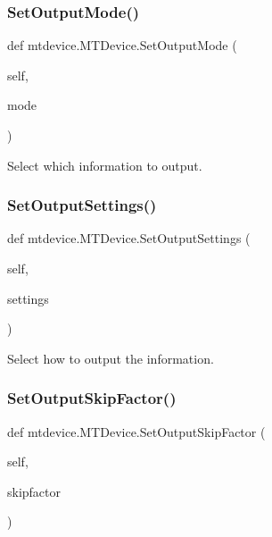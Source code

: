 \subsubsection{\texorpdfstring{Set\+Output\+Mode()}{SetOutputMode()}}
{\footnotesize\ttfamily def mtdevice.\+M\+T\+Device.\+Set\+Output\+Mode (\begin{DoxyParamCaption}\item[{}]{self,  }\item[{}]{mode }\end{DoxyParamCaption})}

\begin{DoxyVerb}Select which information to output.\end{DoxyVerb}
 \mbox{\label{classmtdevice_1_1MTDevice_ac8f77a2d1d393aea71a7790929791cc0}} 
\subsubsection{\texorpdfstring{Set\+Output\+Settings()}{SetOutputSettings()}}
{\footnotesize\ttfamily def mtdevice.\+M\+T\+Device.\+Set\+Output\+Settings (\begin{DoxyParamCaption}\item[{}]{self,  }\item[{}]{settings }\end{DoxyParamCaption})}

\begin{DoxyVerb}Select how to output the information.\end{DoxyVerb}
 \mbox{\label{classmtdevice_1_1MTDevice_a00ae63328881e07081d07a385ecfe858}} 
\subsubsection{\texorpdfstring{Set\+Output\+Skip\+Factor()}{SetOutputSkipFactor()}}
{\footnotesize\ttfamily def mtdevice.\+M\+T\+Device.\+Set\+Output\+Skip\+Factor (\begin{DoxyParamCaption}\item[{}]{self,  }\item[{}]{skipfactor }\end{DoxyParamCaption})}

